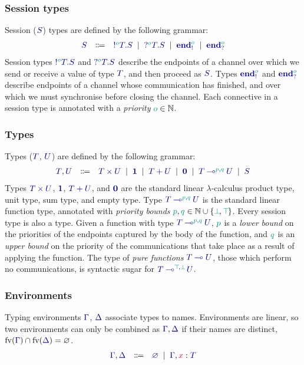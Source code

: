\documentclass[main.tex]{subfiles}
\begin{document}
\subsubsection*{Session types}
Session ($\ty{S}$) types are defined by the following grammar:
\[
\begin{array}{lcl}
  \ty{S}
  & \Coloneqq & \ty{\tysend[\cs{o}]{T}{S}}
    \sep        \ty{\tyrecv[\cs{o}]{T}{S}}
    \sep        \ty{\tyends[\cs{o}]}
    \sep        \ty{\tyendr[\cs{o}]}
\end{array}
\]
Session types $\ty{\tysend[\cs{o}]{T}{S}}$ and $\ty{\tyrecv[\cs{o}]{T}{S}}$ describe the endpoints of a channel over which we send or receive a value of type $\ty{T}$, and then proceed as $\ty{S}$. Types $\ty{\tyends[\cs{o}]}$ and $\ty{\tyendr[\cs{o}]}$ describe endpoints of a channel whose communication has finished, and over which we must synchronise before closing the channel. Each connective in a session type is annotated with a \emph{priority} $\cs{o}\in\mathbb{N}$.

\subsubsection*{Types}
Types ($\ty{T}$, $\ty{U}$) are defined by the following grammar:
\[
\begin{array}{lcl}
  \ty{T}, \ty{U}
  & \Coloneqq & \ty{\typrod{T}{U}}
    \sep        \ty{\tyunit}
    \sep        \ty{\tysum{T}{U}}
    \sep        \ty{\tyvoid}
    \sep        \ty{\tylolli[\cs{p},\cs{q}]{T}{U}}
    \sep        \ty{S}
\end{array}
\]
Types $\ty{\typrod{T}{U}}$, $\ty{\tyunit}$, $\ty{\tysum{T}{U}}$, and $\ty{\tyvoid}$ are the standard linear $\lambda$-calculus product type, unit type, sum type, and empty type.
Type $\ty{\tylolli[\cs{p},\cs{q}]{T}{U}}$ is the standard linear function type, annotated with \emph{priority bounds} $\cs{p},\cs{q}\in\mathbb{N}\cup\{\cs{\pbot},\cs{\ptop}\}$.
Every session type is also a type.
Given a function with type $\ty{\tylolli[\cs{p},\cs{q}]{T}{U}}$, $\cs{p}$ is a \emph{lower bound} on the priorities of the endpoints captured by the body of the function, and $\cs{q}$ is an \emph{upper bound} on the priority of the communications that take place as a result of applying the function. The type of \emph{pure functions} $\ty{\tylolli{T}{U}}$, \ie those which perform no communications, is syntactic sugar for $\ty{\tylolli[\cs{\ptop},\cs{\pbot}]{T}{U}}$.

\subsubsection*{Environments}
Typing environments $\ty{\Gamma}$, $\ty{\Delta}$ associate types to names. Environments are linear, so two environments can only be combined as $\ty{\Gamma}, \ty{\Delta}$ if their names are distinct, \ie $\fv(\ty{\Gamma})\cap\fv(\ty{\Delta})=\varnothing$.
\[
\begin{array}{lcl}
  \ty{\Gamma}, \ty{\Delta}
  & \Coloneqq & \ty{\emptyenv}
    \sep        \ty{\Gamma}, \tmty{x}{T}
\end{array}
\]
\end{document}
